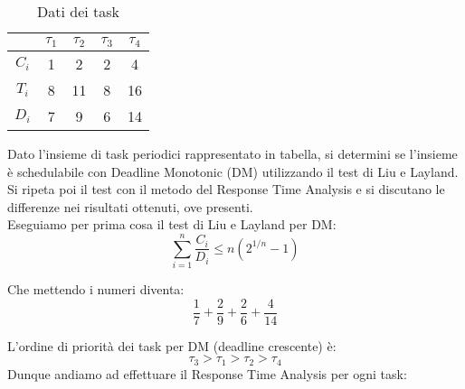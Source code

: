 \begin{Esercizio8}

\begin{table}[H]
\centering
\caption{Dati dei task}
\begin{tabular}{|c|c|c|c|c|}
\hline
 & $\tau_1$ & $\tau_2$ & $\tau_3$ & $\tau_4$ \\
\hline
$C_i$ & 1 & 2 & 2 & 4 \\
\hline
$T_i$ & 8 & 11 & 8 & 16 \\
\hline
$D_i$ & 7 & 9 & 6 & 14 \\
\hline
\end{tabular}
\label{tab:tasks_dm}
\end{table}

Dato l'insieme di task periodici rappresentato in tabella, si determini se l'insieme 
è schedulabile con Deadline Monotonic (DM) utilizzando il test di Liu e Layland.
Si ripeta poi il test con il metodo del Response Time Analysis e si discutano le
differenze nei risultati ottenuti, ove presenti.\\


Eseguiamo per prima cosa il test di Liu e Layland per DM:
\[
\sum_{i=1}^{n} \frac{C_{i}}{D_{i}} \le n (2^{1/n} - 1)
\]

Che mettendo i numeri diventa:
\[\frac{1}{7} + \frac{2}{9} + \frac{2}{6} + \frac{4}{14} \]

L'ordine di priorità dei task per DM (deadline crescente) è:
\[ \tau_{3} > \tau_{1} > \tau_{2} > \tau_{4} \]
Dunque andiamo ad effettuare il Response Time Analysis per ogni task:


\end{Esercizio8}
